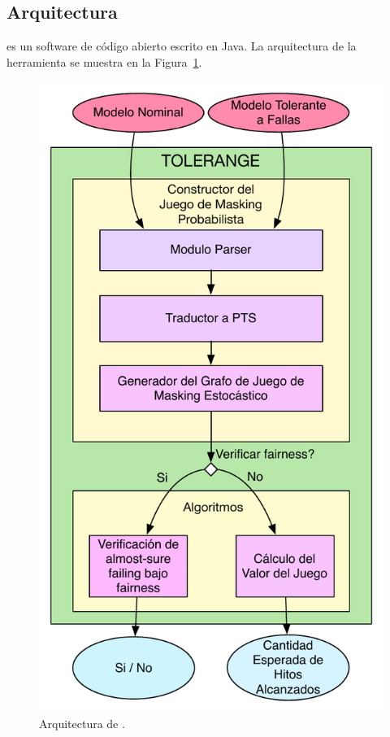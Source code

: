 \subsection{Arquitectura}
{\Tolerange} es un software de código abierto escrito en \textsf{Java}. 
La arquitectura de la herramienta se muestra en la Figura~\ref{fig:arch_tolerange}.
\begin{figure}[ht]
    \centering
    \includegraphics[scale=0.5]{Figs/TOLERANGE_ARCH.pdf}
    \caption{Arquitectura de  \textsf{\Tolerange}.}\label{fig:arch_tolerange}
\end{figure}
